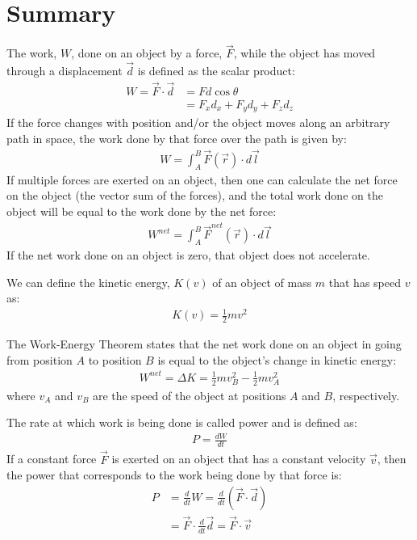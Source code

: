 \section{Summary}
\begin{chapterSummary}{
The work, $W$, done on an object by a force, $\vec F$, while the object has moved through a displacement $\vec d$ is defined as the scalar product:
\begin{align*}
W = \vec F \cdot \vec d &= Fd\cos\theta\\
&= F_xd_x+F_yd_y+F_zd_z
\end{align*}
If the force changes with position and/or the object moves along an arbitrary path in space, the work done by that force over the path is given by:
\begin{align*}
W =\int_A^B \vec F(\vec r) \cdot  d\vec l
\end{align*}
If multiple forces are exerted on an object, then one can calculate the net force on the object (the vector sum of the forces), and the total work done on the object will be equal to the work done by the net force:
\begin{align*}
W^{net} = \int_A^B \vec F^{net}(\vec r) \cdot d\vec l
\end{align*}
If the net work done on an object is zero, that object does not accelerate.

We can define the kinetic energy, $K(v)$ of an object of mass $m$ that has speed $v$ as:
\begin{align*}
K(v) = \frac{1}{2} mv^2
\end{align*}

The Work-Energy Theorem states that the net work done on an object in going from position $A$ to position $B$ is equal to the object's change in kinetic energy:
\begin{align*}
W^{net} = \Delta K = \frac{1}{2} mv_B^2 - \frac{1}{2} mv_A^2
\end{align*}
where $v_A$ and $v_B$ are the speed of the object at positions $A$ and $B$, respectively.

The rate at which work is being done is called power and is defined as:
\begin{align*}
P = \frac{dW}{dt}
\end{align*}
If a constant force $\vec F$ is exerted on an object that has a constant velocity $\vec v$, then the power that corresponds to the work being done by that force is:
\begin{align*}
P &= \frac{d}{dt} W = \frac{d}{dt}(\vec F \cdot \vec d)\\
&= \vec F \cdot \frac{d}{dt}\vec d = \vec F \cdot \vec v
\end{align*}
}
\end{chapterSummary}


